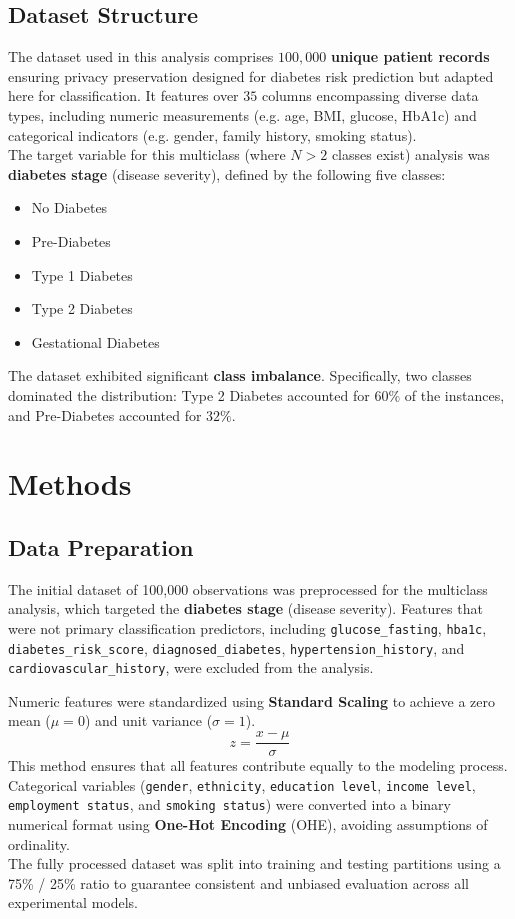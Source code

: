\documentclass[conference]{IEEEtran}
\begin{document}
\subsection{\textbf{Dataset Structure}}
\indent The dataset \cite{rakesh_kolipaka_ranjith_kumar_digutla_2025} used in this analysis comprises $100,000$ \textbf{unique patient records} ensuring privacy preservation designed for diabetes risk prediction but adapted here for classification. It features over $35$ columns encompassing diverse data types, including numeric measurements (e.g. age, BMI, glucose, HbA1c) and categorical indicators (e.g. gender, family history, smoking status).\\
\indent The target variable for this multiclass (where $N > 2$ classes exist) analysis was \textbf{diabetes stage} (disease severity), defined by the following five classes:
\begin{itemize}
	\item No Diabetes
	\item Pre-Diabetes
	\item Type 1 Diabetes
	\item Type 2 Diabetes
	\item Gestational Diabetes
\end{itemize}
\indent The dataset exhibited significant \textbf{class imbalance}. Specifically, two classes dominated the distribution: Type 2 Diabetes accounted for $60\%$ of the instances, and Pre-Diabetes accounted for $32\%$.

\section{\textbf{Methods}}

\subsection{\textbf{Data Preparation}}

\indent The initial dataset of 100,000 observations was preprocessed for the multiclass analysis, which targeted the \textbf{diabetes stage} (disease severity). Features that were not primary classification predictors, including \texttt{glucose\_fasting}, \texttt{hba1c}, \texttt{diabetes\_risk\_score}, \texttt{diagnosed\_diabetes}, \texttt{hypertension\_history}, and \texttt{cardiovascular\_history}, were excluded from the analysis.

\indent Numeric features were standardized using \textbf{Standard Scaling} to achieve a zero mean ($\mu=0$) and unit variance ($\sigma=1$). $$z = \frac{x - \mu}{\sigma}$$  This method ensures that all features contribute equally to the modeling process.\\
\indent Categorical variables (\texttt{gender}, \texttt{ethnicity}, \texttt{education level}, \texttt{income level}, \texttt{employment status}, and \texttt{smoking status}) were converted into a binary numerical format using \textbf{One-Hot Encoding} (OHE), avoiding assumptions of ordinality.\\
\indent The fully processed dataset was split into training and testing partitions using a 75\% / 25\% ratio to guarantee consistent and unbiased evaluation across all experimental models.\\
\end{document}
